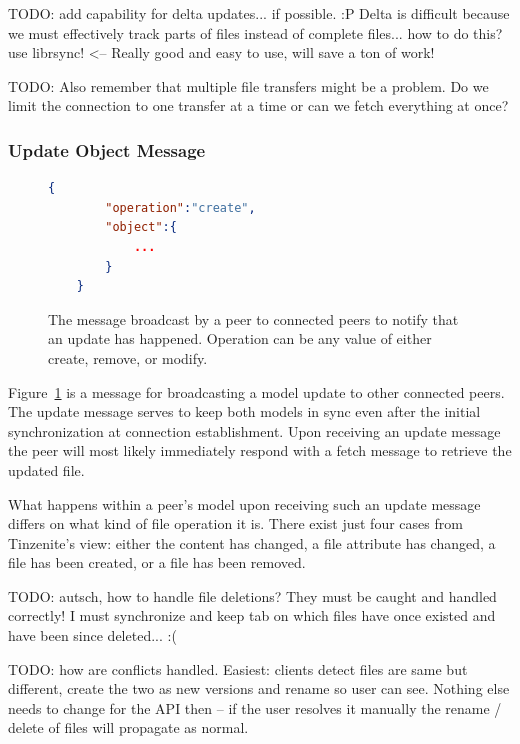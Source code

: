 TODO: add capability for delta updates... if possible. :P
Delta is difficult because we must effectively track parts of files instead of complete files... how to do this?
use librsync! <-- Really good and easy to use, will save a ton of work!

TODO: Also remember that multiple file transfers might be a problem.
Do we limit the connection to one transfer at a time or can we fetch everything at once?

\subsubsection{Update Object Message}
\label{subs:Update Object Message}

\begin{figure}[htp]
    \begin{lstlisting}[language=json,firstnumber=0]
    {
        "operation":"create",
        "object":{
            ...
        }
    }
    \end{lstlisting}
\caption[Update Object Message]{The message broadcast by a peer to connected peers to notify that an update has happened. Operation can be any value of either create, remove, or modify.}
\label{json:update_object}
\end{figure}

Figure~\ref{json:update_object} is a message for broadcasting a model update to other connected peers.
The update message serves to keep both models in sync even after the initial synchronization at connection establishment.
Upon receiving an update message the peer will most likely immediately respond with a fetch message to retrieve the updated file.

What happens within a peer's model upon receiving such an update message differs on what kind of file operation it is.
There exist just four cases from Tinzenite's view: either the content has changed, a file attribute has changed, a file has been created, or a file has been removed.


TODO: autsch, how to handle file deletions?
They must be caught and handled correctly!
I must synchronize and keep tab on which files have once existed and have been since deleted... :(

TODO: how are conflicts handled.
Easiest: clients detect files are same but different, create the two as new versions and rename so user can see.
Nothing else needs to change for the API then – if the user resolves it manually the rename / delete of files will propagate as normal.

